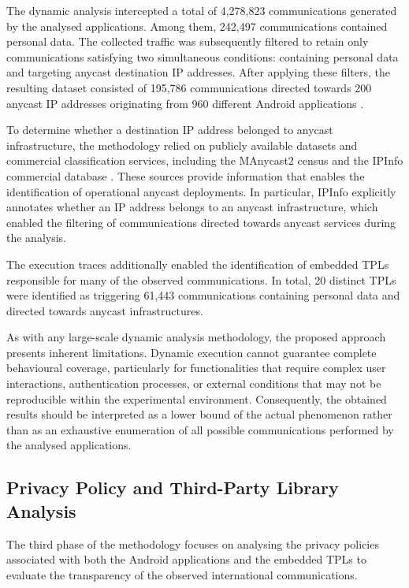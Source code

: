 \documentclass[
A4paper,                %
twoside,                %
openright,              %
chapterprefix=true,     %
12pt,                   %
headings=normal,        %
titlepage=on            %
]{book}
\begin{document}
The dynamic analysis intercepted a total of 4,278,823 communications generated by the analysed applications. Among them, 242,497 communications contained personal data. The collected traffic was subsequently filtered to retain only communications satisfying two simultaneous conditions: containing personal data and targeting anycast destination IP addresses. After applying these filters, the resulting dataset consisted of 195,786 communications directed towards 200 anycast IP addresses originating from 960 different Android applications \cite{Pascual2025AnycastDisaster}.

To determine whether a destination IP address belonged to anycast infrastructure, the methodology relied on publicly available datasets and commercial classification services, including the MAnycast2 census \cite{Sommese2020MAnycast2:Anycast} and the IPInfo commercial database \cite{IPIPinfo}. These sources provide information that enables the identification of operational anycast deployments. In particular, IPInfo explicitly annotates whether an IP address belongs to an anycast infrastructure, which enabled the filtering of communications directed towards anycast services during the analysis.

The execution traces additionally enabled the identification of embedded TPLs responsible for many of the observed communications. In total, 20 distinct TPLs were identified as triggering 61,443 communications containing personal data and directed towards anycast infrastructures.

As with any large-scale dynamic analysis methodology, the proposed approach presents inherent limitations. Dynamic execution cannot guarantee complete behavioural coverage, particularly for functionalities that require complex user interactions, authentication processes, or external conditions that may not be reproducible within the experimental environment. Consequently, the obtained results should be interpreted as a lower bound of the actual phenomenon rather than as an exhaustive enumeration of all possible communications performed by the analysed applications.

\subsection{Privacy Policy and Third-Party Library Analysis}
\label{sc:anycast_experiments_privacy_policies}

The third phase of the methodology focuses on analysing the privacy policies associated with both the Android applications and the embedded TPLs to evaluate the transparency of the observed international communications.
\end{document}
